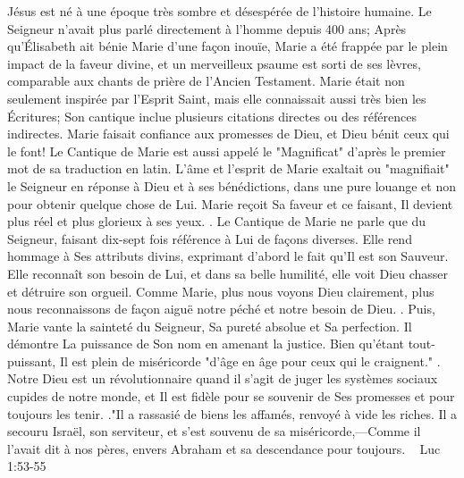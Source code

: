         Jésus est né à une époque très sombre et désespérée de l'histoire humaine. Le Seigneur n'avait plus parlé directement à l'homme depuis 400 ans; Après qu'Élisabeth ait bénie Marie d'une façon inouïe, Marie a été frappée par le plein impact de la faveur divine, et un merveilleux psaume est sorti de ses lèvres, comparable aux chants de prière de l'Ancien Testament. Marie était non seulement inspirée par l'Esprit Saint, mais elle connaissait aussi très bien les Écritures; Son cantique inclue plusieurs citations directes ou des références indirectes. Marie faisait confiance aux promesses de Dieu, et Dieu bénit ceux qui le font!
        Le Cantique de Marie est aussi appelé le "Magnificat" d'après le premier mot de sa traduction en latin. L'âme et l'esprit de Marie exaltait ou "magnifiait" le Seigneur en réponse à Dieu et à ses bénédictions, dans une pure louange et non pour obtenir quelque chose de Lui. Marie reçoit Sa faveur et ce faisant, Il devient plus réel et plus glorieux à ses yeux. . Le Cantique de Marie ne parle que du Seigneur, faisant dix-sept fois référence à Lui de façons diverses. Elle rend hommage à Ses attributs divins, exprimant d'abord le fait qu'Il est son Sauveur. Elle reconnaît son besoin de Lui, et dans sa belle humilité, elle voit Dieu chasser et détruire son orgueil. Comme Marie, plus nous voyons Dieu clairement, plus nous reconnaissons de façon aiguë notre péché et notre besoin de Dieu. . Puis, Marie vante la sainteté du Seigneur, Sa pureté absolue et Sa perfection. Il démontre La puissance de Son nom en amenant la justice. Bien qu'étant tout-puissant, Il est plein de miséricorde "d'âge en âge pour ceux qui le craignent." . Notre Dieu est un révolutionnaire quand il s'agit de juger les systèmes sociaux cupides de notre monde, et Il est fidèle pour se souvenir de Ses promesses et pour toujours les tenir. ."Il a rassasié de biens les affamés, renvoyé à vide les riches. Il a secouru Israël, son serviteur, et s’est souvenu de sa miséricorde,—Comme il l’avait dit à nos pères, envers Abraham et sa descendance pour toujours. ~ Luc 1:53-55 
              
